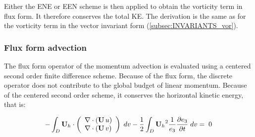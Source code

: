 \documentclass[../main/NEMO_manual]{subfiles}
\begin{document}
Either the ENE or EEN scheme is then applied to obtain the vorticity term in flux form.
It therefore conserves the total KE.
The derivation is the same as for the vorticity term in the vector invariant form (\autoref{subsec:INVARIANTS_vor}).

\subsubsection{Flux form advection}
\label{subsec:INVARIANTS_3.4}

The flux form operator of the momentum advection is evaluated using
a centered second order finite difference scheme.
Because of the flux form, the discrete operator does not contribute to the global budget of linear momentum.
Because of the centered second order scheme, it conserves the horizontal kinetic energy, that is:

\begin{equation}
  \label{eq:INVARIANTS_ADV_KE_flux}
  -  \int_D \textbf{U}_h \cdot     \left(                 {{
        \begin{array} {*{20}c}
          \nabla \cdot \left( \textbf{U}\,u \right) \hfill \\
          \nabla \cdot \left( \textbf{U}\,v \right) \hfill \\
        \end{array}
      } }           \right)   \;dv
  -   \frac{1}{2} \int_D {  {\textbf{U}_h}^2 \frac{1}{e_3} \frac{\partial  e_3 }{\partial t} \;dv } =\;0
\end{equation}
\end{document}
